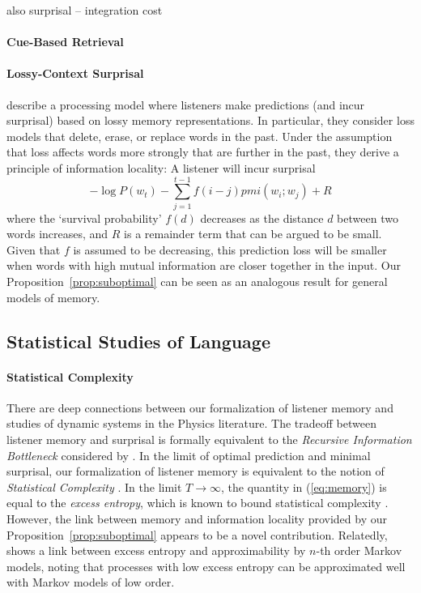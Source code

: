 also surprisal -- integration cost

\paragraph{Cue-Based Retrieval}

\paragraph{Lossy-Context Surprisal}
\citet{futrell-noisy-context-2017} describe a processing model where listeners make predictions (and incur surprisal) based on lossy memory representations.
In particular, they consider loss models that delete, erase, or replace words in the past.
Under the assumption that loss affects words more strongly that are further in the past, they derive a principle of information locality:
A listener will incur surprisal
$$ -\log P(w_t) - \sum_{j=1}^{t-1} f(i-j) pmi(w_i; w_j) + R$$
where the `survival probability' $f(d)$ decreases as the distance $d$ between two words increases, and $R$ is a remainder term that can be argued to be small.
Given that $f$ is assumed to be decreasing, this prediction loss will be smaller when words with high mutual information are closer together in the input.
Our Proposition~\ref{prop:suboptimal} can be seen as an analogous result for general models of memory.




\subsection{Statistical Studies of Language}

\paragraph{Statistical Complexity}
There are deep connections between our formalization of listener memory and studies of dynamic systems in the Physics literature.
The tradeoff between listener memory and surprisal is formally equivalent to the \emph{Recursive Information Bottleneck} considered by \cite{still-information-2014}.
In the limit of optimal prediction and minimal surprisal, our formalization of listener memory is equivalent to the notion of \emph{Statistical Complexity} \citep{crutchfield-inferring-1989}.
In the limit $T \rightarrow \infty$, the quantity in (\ref{eq:memory}) is equal to the \emph{excess entropy}, which is known to bound statistical complexity \citep{crutchfield-inferring-1989}.
However, the link between memory and information locality provided by our Proposition~\ref{prop:suboptimal} appears to be a novel contribution.
Relatedly, \cite{sharan-prediction-2016} shows a link between excess entropy and approximability by $n$-th order Markov models, noting that processes with low excess entropy can be approximated well with Markov models of low order.

